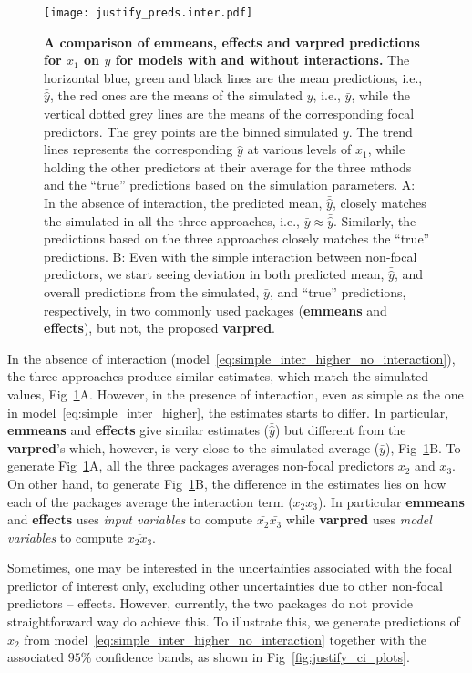 \documentclass[10pt,letterpaper]{article}
\newcommand{\pkg}[1]{\textbf{#1}}
\let\over=\overline
\begin{document}
\begin{figure}[!h]
\centering
\texttt{[image: justify\_preds.inter.pdf]}
\caption{{\bf A comparison of \pkg{emmeans}, \pkg{effects} and \pkg{varpred} predictions for $x_1$ on $y$ for models with and without interactions.}
The horizontal blue, green and black lines are the mean predictions, i.e., $\bar{\hat{y}}$, the red ones are the means of the simulated $y$, i.e., $\bar{y}$, while the vertical dotted grey lines are the means of the corresponding focal predictors. The grey points are the binned simulated $y$. The trend lines represents the corresponding $\hat{y}$ at various levels of $x_1$, while holding the other predictors at their average for the three mthods and the ``true'' predictions based on the simulation parameters. A: In the absence of interaction, the predicted mean, $\bar{\hat{y}}$, closely matches the simulated in all the three approaches, i.e., $\bar{y} \approx \bar{\hat{y}}$. Similarly, the predictions based on the three approaches closely matches the ``true'' predictions. B: Even with the simple interaction between non-focal predictors, we start seeing deviation in both predicted mean, $\bar{\hat{y}}$, and overall predictions from the simulated, $\bar{y}$, and ``true'' predictions, respectively, in two commonly used packages (\pkg{emmeans} and \pkg{effects}), but not, the proposed \pkg{varpred}.}
\label{fig:justify_plots}
\end{figure}

In the absence of interaction (model~\ref{eq:simple_inter_higher_no_interaction}), the three approaches produce similar estimates, which match the simulated values, Fig~\ref{fig:justify_plots}A. However, in the presence of interaction, even as simple as the one in model~\ref{eq:simple_inter_higher}, the estimates starts to differ. In particular, \pkg{emmeans} and \pkg{effects} give similar estimates ($\bar{\hat{y}}$) but different from the \pkg{varpred}'s which, however, is very close to the simulated average ($\bar{y}$), Fig~\ref{fig:justify_plots}B. To generate Fig~\ref{fig:justify_plots}A, all the three packages averages non-focal predictors $x_2$ and $x_3$. On other hand, to generate Fig~\ref{fig:justify_plots}B, the difference in the estimates lies on how each of the packages average the interaction term ($x_2x_3$). In particular \pkg{emmeans} and \pkg{effects} uses \emph{input variables} to compute $\bar{x_2}\bar{x_3}$ while \pkg{varpred} uses \emph{model variables} to compute $\over{x_2x_3}$.

Sometimes, one may be interested in the uncertainties associated with the focal predictor of interest only, excluding other uncertainties due to other non-focal predictors -- effects. However, currently, the two packages do not provide straightforward way do achieve this. To illustrate this, we generate predictions of $x_2$ from model~\ref{eq:simple_inter_higher_no_interaction} together with the associated $95\%$ confidence bands, as shown in Fig~\ref{fig:justify_ci_plots}. 
\end{document}
